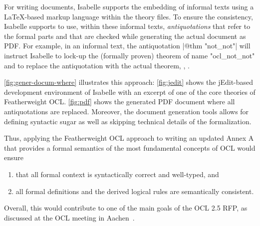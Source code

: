 For writing documents, Isabelle supports the embedding of informal
texts using a \LaTeX-based markup language within the theory files. To
ensure the consistency, Isabelle supports to use, within these
informal texts, \emph{antiquotations} that refer to the formal parts
and that are checked while generating the actual document as
PDF\@. For example, in an informal text, the antiquotation
\inlineisar|@{$\text{thm}$ "not_not"}| will instruct Isabelle to
lock-up the (formally proven) theorem of name \inlineisar"ocl_not_not"
and to replace the antiquotation with the actual theorem, \ie,
.

\autoref{fig:gener-docum-where}
illustrates this approach: \autoref{fig:jedit} shows the jEdit-based
development environment of Isabelle with an excerpt of one of the core
theories of Featherweight OCL\@. \autoref{fig:pdf} shows the generated
PDF document where all antiquotations are replaced. Moreover,
the document generation tools allows for defining syntactic sugar as
well as skipping technical details of the formalization.


Thus, applying the Featherweight OCL approach to writing an updated
Annex A that provides a formal semantics of the most fundamental
concepts of OCL would ensure
\begin{enumerate}
\item that all formal context is syntactically correct and well-typed,
  and
\item all formal definitions and the derived logical rules are
  semantically consistent.
\end{enumerate}
Overall, this would contribute to one of the main goals of the OCL 2.5
RFP, as discussed at the OCL meeting in
Aachen~\cite{brucker.ea:summary-aachen:2013}.


